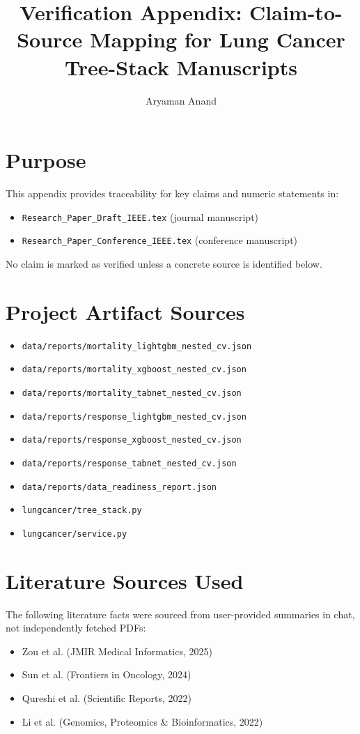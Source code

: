 \documentclass[journal]{IEEEtran}
\begin{document}
\title{Verification Appendix: Claim-to-Source Mapping for Lung Cancer Tree-Stack Manuscripts}
\author{Aryaman Anand}
\maketitle

\section{Purpose}
This appendix provides traceability for key claims and numeric statements in:
\begin{itemize}
    \item \texttt{Research\_Paper\_Draft\_IEEE.tex} (journal manuscript)
    \item \texttt{Research\_Paper\_Conference\_IEEE.tex} (conference manuscript)
\end{itemize}

No claim is marked as verified unless a concrete source is identified below.

\section{Project Artifact Sources}
\begin{itemize}
    \item \texttt{data/reports/mortality\_lightgbm\_nested\_cv.json}
    \item \texttt{data/reports/mortality\_xgboost\_nested\_cv.json}
    \item \texttt{data/reports/mortality\_tabnet\_nested\_cv.json}
    \item \texttt{data/reports/response\_lightgbm\_nested\_cv.json}
    \item \texttt{data/reports/response\_xgboost\_nested\_cv.json}
    \item \texttt{data/reports/response\_tabnet\_nested\_cv.json}
    \item \texttt{data/reports/data\_readiness\_report.json}
    \item \texttt{lungcancer/tree\_stack.py}
    \item \texttt{lungcancer/service.py}
\end{itemize}

\section{Literature Sources Used}
The following literature facts were sourced from user-provided summaries in chat, not independently fetched PDFs:
\begin{itemize}
    \item Zou et al. (JMIR Medical Informatics, 2025)
    \item Sun et al. (Frontiers in Oncology, 2024)
    \item Qureshi et al. (Scientific Reports, 2022)
    \item Li et al. (Genomics, Proteomics \& Bioinformatics, 2022)
\end{itemize}
\end{document}
